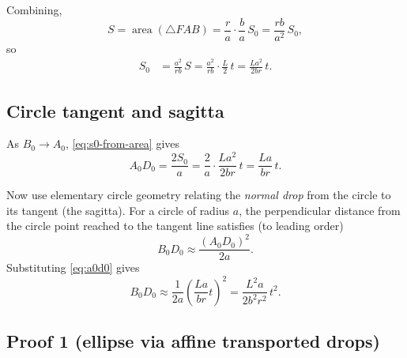 Combining,
\begin{equation}
  S=\operatorname{area}(\triangle F A B)=\frac{r}{a}\cdot\frac{b}{a}\,S_0=\frac{rb}{a^2}\,S_0,
\end{equation}
so
\begin{align}
  S_0 &= \frac{a^2}{rb}\,S \label{eq:s0-from-area}
  = \frac{a^2}{rb}\cdot \frac{L}{2}\,t
  = \frac{L a^2}{2 b r}\,t.
\end{align}

\subsection{Circle tangent and sagitta}
\label{subsec:sagitta}

As $B_0\to A_0$, \eqref{eq:s0-from-area} gives
\begin{equation}\label{eq:a0d0}
  A_0D_0 = \frac{2S_0}{a}=
  \frac{2}{a}\cdot\frac{L a^2}{2 b r}\,t
  =\frac{L a}{b r}\,t.
\end{equation}

Now use elementary circle geometry relating the \emph{normal drop} from the circle to its tangent (the sagitta). For a circle of radius $a$, the perpendicular distance from the circle point reached to the tangent line satisfies (to leading order)
\begin{equation}
  B_0D_0 \approx \frac{(A_0D_0)^2}{2a}.
\end{equation}
Substituting \eqref{eq:a0d0} gives
\begin{equation}
  B_0D_0 \approx \frac{1}{2a}\left(\frac{L a}{b r}t\right)^2
  = \frac{L^2 a}{2 b^2 r^2}\,t^2.
\end{equation}

\subsection{Proof 1 (ellipse via affine transported drops)}
\label{subsec:proof1-ellipse-affine}

